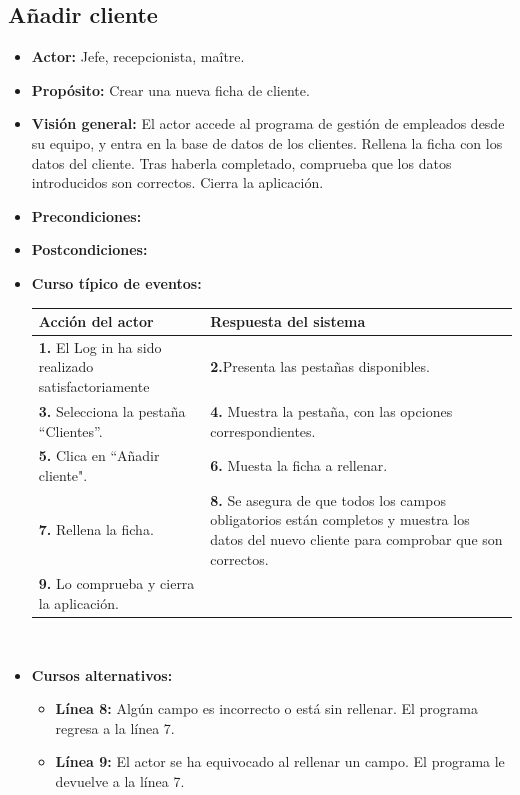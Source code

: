 \documentclass[spanish,a4paper,11pt, twoside]{report}	%
\begin{document}
	\subsection{Añadir cliente}
		
			\begin{itemize}
			\item \textbf{Actor:} Jefe, recepcionista, maître.
			\item \textbf{Propósito:} Crear una nueva ficha de cliente.
			\item \textbf{Visión general:} El actor accede al programa de gestión de empleados desde su equipo, y entra en la base de datos de los clientes. Rellena la ficha con los datos del cliente. Tras haberla completado, comprueba que los datos introducidos son correctos. Cierra la aplicación. 
			\item \textbf{Precondiciones:} 
			\item \textbf{Postcondiciones:} 
			\item \textbf{Curso típico de eventos:} 	\\
				\begin{tabular}{|p{6cm}||p{6cm}|}
				\hline
				\textbf{Acción del actor} & \textbf{Respuesta del sistema} \\ \hline \hline
				\textbf{1.} El Log in ha sido realizado satisfactoriamente & \textbf{2.}Presenta las pestañas disponibles.\\ \hline 
				\textbf{3.} Selecciona la pestaña “Clientes”. & \textbf{4.} Muestra la pestaña, con las opciones correspondientes. \\ \hline
				\textbf{5.} Clica en “Añadir cliente".	& \textbf{6.} Muesta la ficha a rellenar. \\ \hline
				\textbf{7.} Rellena la ficha. & \textbf{8.} Se asegura de que todos los campos obligatorios están completos y muestra los datos del nuevo cliente para comprobar que son correctos.\\ \hline
				\textbf{9.} Lo comprueba y cierra la aplicación. & \textbf{} \\ \hline
			\end{tabular}
			\\
			\item \textbf{Cursos alternativos:} 
			\begin{itemize}
			\item  \textbf{Línea 8:} Algún campo es incorrecto o está sin rellenar. El programa regresa a la línea 7.
			\item  \textbf{Línea 9:} El actor se ha equivocado al rellenar un campo. El programa le devuelve a la línea 7.
			\end {itemize}
		\end{itemize}%
\end{document}
